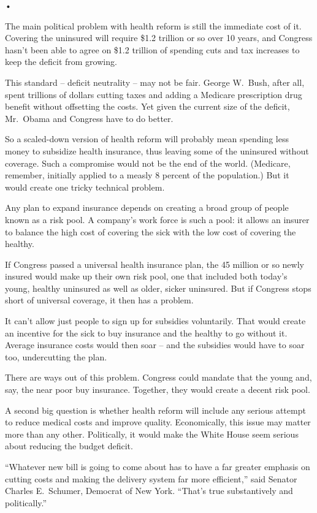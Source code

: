 ﻿\documentclass[12pt]{article}
\begin{document}
•

The main political problem with health reform is still the immediate cost of it. Covering the
uninsured will require \$1.2 trillion or so over 10 years, and Congress hasn't been able to agree on
\$1.2 trillion of spending cuts and tax increases to keep the deficit from growing.

This standard -- deficit neutrality -- may not be fair. George W.~Bush, after all, spent trillions
of dollars cutting taxes and adding a Medicare prescription drug benefit without offsetting the
costs. Yet given the current size of the deficit, Mr.~Obama and Congress have to do better.

So a scaled-down version of health reform will probably mean spending less money to subsidize health
insurance, thus leaving some of the uninsured without coverage. Such a compromise would not be the
end of the world. (Medicare, remember, initially applied to a measly 8 percent of the population.)
But it would create one tricky technical problem.

Any plan to expand insurance depends on creating a broad group of people known as a risk pool. A
company's work force is such a pool: it allows an insurer to balance the high cost of covering the
sick with the low cost of covering the healthy.

If Congress passed a universal health insurance plan, the 45 million or so newly insured would make
up their own risk pool, one that included both today's young, healthy uninsured as well as older,
sicker uninsured. But if Congress stops short of universal coverage, it then has a problem.

It can't allow just people to sign up for subsidies voluntarily. That would create an incentive for
the sick to buy insurance and the healthy to go without it. Average insurance costs would then soar
-- and the subsidies would have to soar too, undercutting the plan.

There are ways out of this problem. Congress could mandate that the young and, say, the near poor
buy insurance. Together, they would create a decent risk pool.

A second big question is whether health reform will include any serious attempt to reduce medical
costs and improve quality. Economically, this issue may matter more than any other. Politically, it
would make the White House seem serious about reducing the budget deficit.

``Whatever new bill is going to come about has to have a far greater emphasis on cutting costs and
making the delivery system far more efficient,'' said Senator Charles E.~Schumer, Democrat of New
York. ``That's true substantively and politically.''
\end{document}
